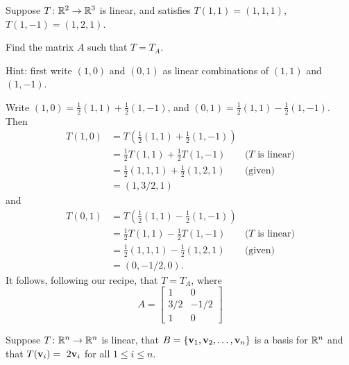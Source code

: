 \bb
\ii Suppose $T\colon{\mathbb R}^2\rightarrow {\mathbb R}^3$ is linear, and satisfies $T(1,1)=(1,1,1)$, $T(1,-1)=(1,2,1)$. 

Find the matrix $A$ such that $T=T_A$. 

Hint: first write $(1,0)$ and $(0,1)$ as linear combinations of $(1,1)$ and $(1,-1)$. 
\\
\begin{solution}
Write $(1,0)=\frac{1}{2}(1,1)+\frac{1}{2}(1,-1)$, and $(0,1)=\frac{1}{2}(1,1)-\frac{1}{2}(1,-1)$. 
Then 
\begin{align*}
T(1,0)&=T(\frac{1}{2}(1,1)+\frac{1}{2}(1,-1))\\
&=\frac{1}{2}T(1,1)+\frac{1}{2}T(1,-1) &\text{($T$ is linear)}\\
&=\frac{1}{2}(1,1,1)+\frac{1}{2}(1,2,1) &\text{(given)}\\
&=(1,3/2,1)
\end{align*}
and 
\begin{align*}
T(0,1)&=T(\frac{1}{2}(1,1)-\frac{1}{2}(1,-1))\\
&=\frac{1}{2}T(1,1)-\frac{1}{2}T(1,-1) &\text{($T$ is linear)}\\
&=\frac{1}{2}(1,1,1)-\frac{1}{2}(1,2,1) &\text{(given)}\\
&=(0,-1/2,0).
\end{align*}
It follows, following our recipe, that $T=T_A$, where 
\[
A=\begin{bmatrix}
1&0\\
3/2&-1/2\\
1&0
\end{bmatrix}
\]
\end{solution}
\ii Suppose $T\colon {\mathbb R}^n\rightarrow {\mathbb R}^n$ is linear, that $B=\{{\mathbf v}_1,{\mathbf v}_2,\dots, {\mathbf v}_n\}$ is a basis for ${\mathbb R}^n$ and that 
$T({\mathbf v}_i)=~2{\mathbf v}_i$ for all $1\leq i\leq n$. 

